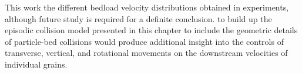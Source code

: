 This work \DIFdelbegin {}\DIFdelend \DIFaddbegin {}\DIFaddend the different bedload velocity distributions obtained in experiments, although future study is required for a definite conclusion.
\DIFdelbegin {}\DIFdelend \DIFaddbegin {}\DIFaddend to build up the episodic collision model presented in this chapter to include the geometric details of particle-bed collisions \DIFdelbegin {}\DIFdelend \DIFaddbegin {}\DIFaddend would produce additional insight into the controls of \DIFaddbegin {}\DIFaddend transverse, vertical, and rotational movements on the downstream velocities of individual \DIFaddbegin {}\DIFaddend grains.

